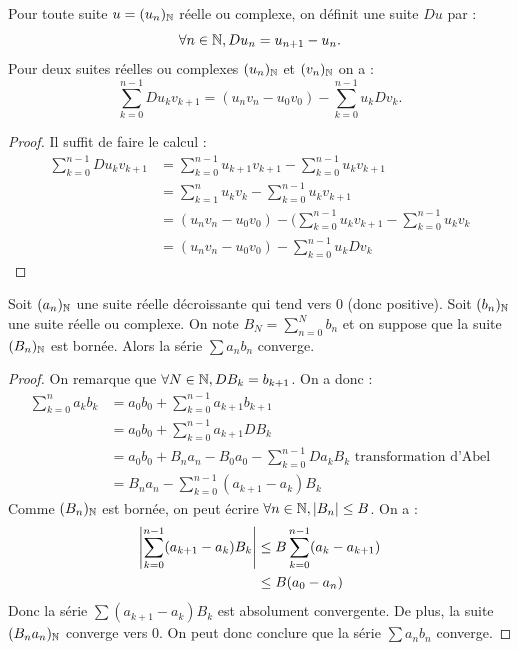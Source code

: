 \documentclass[french]{article}
\begin{document}
\begin{lem}
Pour toute suite $u=(u_n)_\N$ réelle ou complexe, on définit une suite $Du$ par :
\[ \forall n \in \N, Du_n = u_{n+1} - u_n . \]
Pour deux suites réelles ou complexes $(u_n)_\N$ et $(v_n)_\N$ on a :
\[ \sum_{k=0}^{n-1} Du_k v_{k+1} = (u_n v_n - u_0 v_0) - \sum_{k=0}^{n-1} u_k Dv_k . \] 
\end{lem}

\begin{proof}
Il suffit de faire le calcul :
\begin{align*}
\sum_{k=0}^{n-1} Du_k v_{k+1} &= \sum_{k=0}^{n-1} u_{k+1} v_{k+1} - \sum_{k=0}^{n-1} u_k v_{k+1} \\
& = \sum_{k=1}^{n} u_{k} v_{k} - \sum_{k=0}^{n-1} u_k v_{k+1} \\
& = (u_n v_n - u_0 v_0) - (\sum_{k=0}^{n-1} u_k v_{k+1} - \sum_{k=0}^{n-1} u_k v_{k} \\
& = (u_n v_n - u_0 v_0) - \sum_{k=0}^{n-1} u_k Dv_k
\end{align*}
\end{proof}

\begin{thm}
Soit $(a_n)_\N$ une suite réelle décroissante qui tend vers 0 (donc positive).
Soit $(b_n)_\N$ une suite réelle ou complexe. On note $B_N = \sum_{n=0}^N b_n$ et on suppose que la suite $(B_n)_\N$ est bornée.
Alors la série $\sum a_n b_n$ converge.
\end{thm}

\begin{proof}
On remarque que $\forall N \in \N, DB_k = b_{k+1}$. On a donc :
\begin{align*}
\sum_{k=0}^n a_k b_k & = a_0 b_0 + \sum_{k=0}^{n-1} a_{k+1} b_{k+1} \\
& =  a_0 b_0 + \sum_{k=0}^{n-1} a_{k+1} DB_k \\
& = a_0 b_0 + B_n a_n - B_0 a_0 - \sum_{k=0}^{n-1} Da_k B_k \text{ transformation d'Abel} \\
& = B_n a_n - \sum_{k=0}^{n-1} (a_{k+1} - a_k) B_k
\end{align*}
Comme $(B_n)_\N$ est bornée, on peut écrire $\forall n \in \N, \abs{B_n} \leq B$. On a :
\begin{align*}
\abs*{ \sum_{k=0}^{n-1} (a_{k+1} - a_k) B_k} & \leq B \sum_{k=0}^{n-1} (a_k - a_{k+1}) \\
& \leq B (a_0 - a_n) 
\end{align*}
Donc la série $\sum (a_{k+1} - a_k) B_k$ est absolument convergente. De plus, la suite $(B_n a_n)_\N$ converge vers 0. 
On peut donc conclure que la série $\sum a_n b_n$ converge.
\end{proof}
\end{document}
